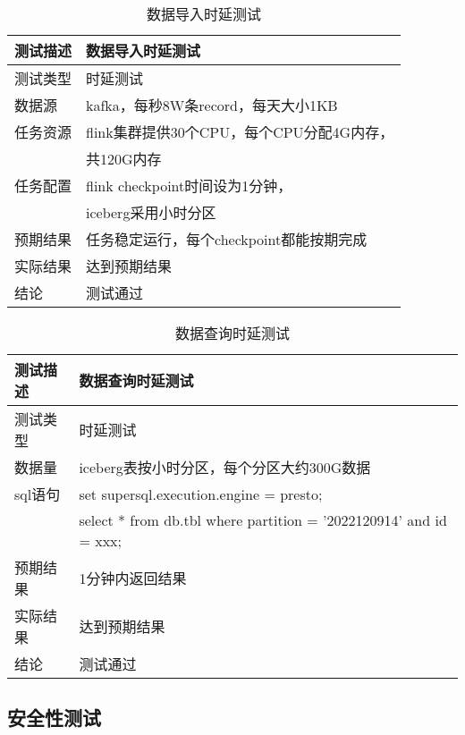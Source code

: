 \begin{table}[H]
  \centering
  \caption{数据导入时延测试}
  \label{tab:数据导入}
  \begin{tabular}{ll}
    \toprule
    测试描述         & 数据导入时延测试         \\
    \midrule
    测试类型         & 时延测试         \\
    数据源           & kafka，每秒8W条record，每天大小1KB     \\
    任务资源         & flink集群提供30个CPU，每个CPU分配4G内存， \\
                   &  共120G内存     \\
    任务配置         & flink checkpoint时间设为1分钟，  \\
                    &  iceberg采用小时分区      \\
    预期结果         & 任务稳定运行，每个checkpoint都能按期完成  \\
    实际结果         & 达到预期结果           \\
    结论            & 测试通过           \\
    \bottomrule
  \end{tabular}
\end{table}

\begin{table}[H]
  \centering
  \caption{数据查询时延测试}
  \label{tab:数据查询}
  \begin{tabular}{ll}
    \toprule
    测试描述         & 数据查询时延测试         \\
    \midrule
    测试类型         & 时延测试         \\
    数据量          & iceberg表按小时分区，每个分区大约300G数据  \\
    sql语句         & set supersql.execution.engine = presto;    \\
                   & select * from db.tbl where partition = '2022120914' and id = xxx;       \\
    预期结果         & 1分钟内返回结果  \\
    实际结果         & 达到预期结果           \\
    结论            & 测试通过           \\
    \bottomrule
  \end{tabular}
\end{table}

\subsection{安全性测试}


